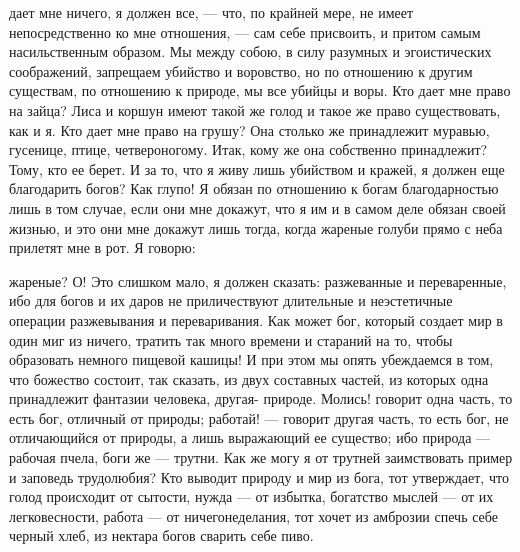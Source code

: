 \documentclass[12pt]{article}
\begin{document}
дает мне ничего, я должен все, --- что, по крайней мере, не имеет непосредственно ко мне отношения, --- сам себе присвоить, и притом самым насильственным образом. Мы между собою, в силу разумных и эгоистических соображений, запрещаем убийство и воровство, но по отношению к другим существам, по отношению к природе, мы все убийцы и воры. Кто дает мне право на зайца? Лиса и коршун имеют такой же голод и такое же право существовать, как и я. Кто дает мне право на грушу? Она столько же принадлежит муравью, гусенице, птице, четвероногому. Итак, кому же она собственно принадлежит? Тому, кто ее берет. И за то, что я живу лишь убийством и кражей, я должен еще благодарить богов? Как глупо! Я обязан по отношению к богам благодарностью лишь в том случае, если они мне докажут, что я им и в самом деле обязан своей жизнью, и это они мне докажут лишь тогда, когда жареные голуби прямо с неба прилетят мне в рот. Я говорю: 

жареные? О! Это слишком мало, я должен сказать: разжеванные и переваренные, ибо для богов и их даров не приличествуют длительные и неэстетичные операции разжевывания и переваривания. Как может бог, который создает мир в один миг из ничего, тратить так много времени и стараний на то, чтобы образовать немного пищевой кашицы! И при этом мы опять убеждаемся в том, что божество состоит, так сказать, из двух составных частей, из которых одна принадлежит фантазии человека, другая- природе. Молись! говорит одна часть, то есть бог, отличный от природы; работай! --- говорит другая часть, то есть бог, не отличающийся от природы, а лишь выражающий ее существо; ибо природа --- рабочая пчела, боги же --- трутни. Как же могу я от трутней заимствовать пример и заповедь трудолюбия? Кто выводит природу и мир из бога, тот утверждает, что голод происходит от сытости, нужда --- от избытка, богатство мыслей --- от их легковесности, работа --- от ничегонеделания, тот хочет из амброзии спечь себе черный хлеб, из нектара богов сварить себе пиво. 
\end{document}
